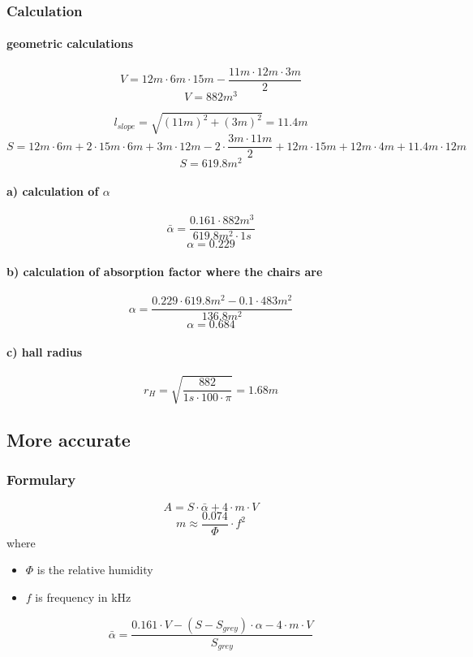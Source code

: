 \documentclass{article}
\begin{document}
			\subsubsection{Calculation}
			\paragraph{geometric calculations}
			$$V=12m\cdot 6m\cdot 15m - \frac{11m\cdot 12m\cdot 3m}{2}$$
			$$V=882m^3$$

			$$l_{slope}=\sqrt{(11m)^2+(3m)^2}=11.4m$$
			$$S=12m\cdot 6m+2\cdot 15m\cdot 6m+3m\cdot 12m-2\cdot\frac{3m\cdot 11m}{2}+12m\cdot 15m+12m\cdot 4m+11.4m\cdot 12m$$
			$$S=619.8m^2$$


			\paragraph{a) calculation of $\alpha$}
			$$\bar{\alpha}=\frac{0.161\cdot 882m^3}{619.8m^2\cdot 1s}$$
			$$\alpha=0.229$$
			
			\paragraph{b) calculation of absorption factor where the chairs are}
				$$\alpha=\frac{0.229\cdot 619.8m^2-0.1\cdot 483m^2}{136.8m^2}$$
				$$\alpha=0.684$$
			\paragraph{c) hall radius}
				$$r_H=\sqrt{\frac{882}{1s\cdot 100\cdot \pi}}=1.68m$$
		\subsection{More accurate}
			\subsubsection{Formulary}
				\begin{equation}
					A=S\cdot\bar{\alpha}+4\cdot m\cdot V
				\end{equation}
				\begin{equation}
					m\approx\frac{0.074}{\Phi}\cdot f^2
				\end{equation}
				where 
				\begin{itemize}
					\item $\Phi$ is the relative humidity
					\item $f$ is frequency in kHz
				\end{itemize}
				\begin{equation}
					\bar{\alpha}=\frac{0.161\cdot V-(S-S_{grey})\cdot\alpha-4\cdot m\cdot V}{S_{grey}}
				\end{equation}
\end{document}
